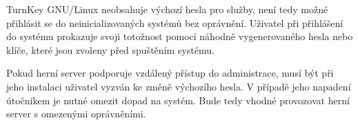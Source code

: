 TurnKey GNU/Linux
neobsahuje výchozí hesla pro služby, není tedy možné přihlásit se do neinicializovaných systémů bez oprávnění.
Uživatel při přihlášení do systému prokazuje svoji totožnost pomocí náhodně vygenerovaného hesla nebo klíče, které
jsou zvoleny před spuštěním systému. 

Pokud herní server podporuje vzdálený přístup do administrace, musí být při jeho instalaci uživatel vyzván ke změně výchozího hesla.
V případě jeho napadení útočníkem je nutné omezit dopad na systém. Bude tedy vhodné provozovat herní server s omezenými oprávněními. 
